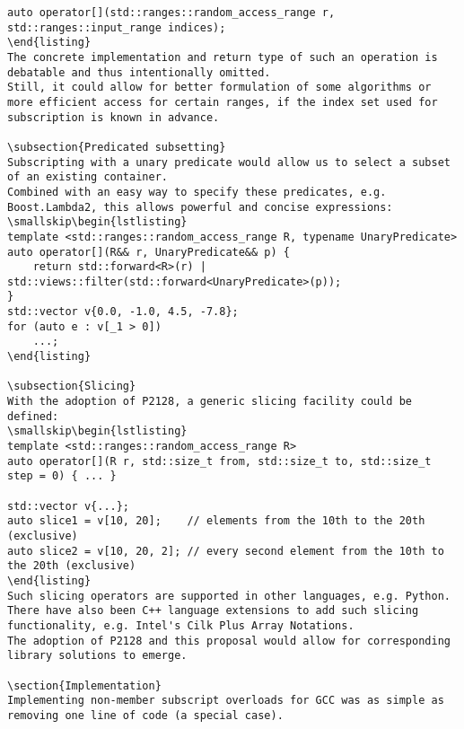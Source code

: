 \smallskip\begin{lstlisting}
auto operator[](std::ranges::random_access_range r, std::ranges::input_range indices);
\end{listing}
The concrete implementation and return type of such an operation is debatable and thus intentionally omitted.
Still, it could allow for better formulation of some algorithms or more efficient access for certain ranges, if the index set used for subscription is known in advance.

\subsection{Predicated subsetting}
Subscripting with a unary predicate would allow us to select a subset of an existing container.
Combined with an easy way to specify these predicates, e.g. Boost.Lambda2, this allows powerful and concise expressions:
\smallskip\begin{lstlisting}
template <std::ranges::random_access_range R, typename UnaryPredicate>
auto operator[](R&& r, UnaryPredicate&& p) {
	return std::forward<R>(r) | std::views::filter(std::forward<UnaryPredicate>(p));
}
std::vector v{0.0, -1.0, 4.5, -7.8};
for (auto e : v[_1 > 0])
	...;
\end{listing}

\subsection{Slicing}
With the adoption of P2128, a generic slicing facility could be defined:
\smallskip\begin{lstlisting}
template <std::ranges::random_access_range R>
auto operator[](R r, std::size_t from, std::size_t to, std::size_t step = 0) { ... }

std::vector v{...};
auto slice1 = v[10, 20];    // elements from the 10th to the 20th (exclusive)
auto slice2 = v[10, 20, 2]; // every second element from the 10th to the 20th (exclusive)
\end{listing}
Such slicing operators are supported in other languages, e.g. Python.
There have also been C++ language extensions to add such slicing functionality, e.g. Intel's Cilk Plus Array Notations.
The adoption of P2128 and this proposal would allow for corresponding library solutions to emerge.

\section{Implementation}
Implementing non-member subscript overloads for GCC was as simple as removing one line of code (a special case).


\end{lstlisting}
